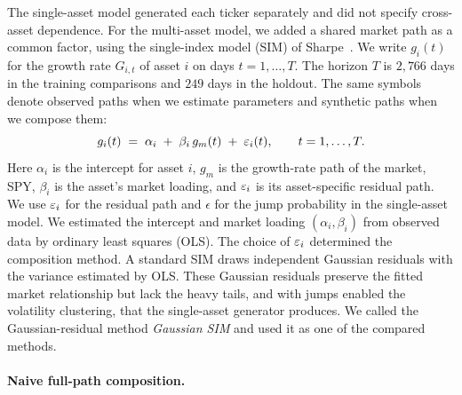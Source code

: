 
The single-asset model generated each ticker separately and did not
specify cross-asset dependence. For the multi-asset model, we added a
shared market path as a common factor, using the single-index model
(SIM) of Sharpe~\cite{sharpe1963}. We write $g_i(t)$ for the growth rate $G_{i,t}$ of asset $i$ on days
$t=1,\dots,T$. The horizon $T$ is $2{,}766$ days in the training
comparisons and $249$ days in the holdout. The same symbols denote
observed paths when we estimate parameters and synthetic paths when
we compose them:
\begin{equation}
  g_i(t) \;=\; \alpha_i \;+\; \beta_i\, g_m(t) \;+\; \varepsilon_i(t),
  \qquad t = 1,\dots,T.
  \label{eq:sim-composition}
\end{equation}
Here $\alpha_i$ is the intercept for asset $i$, $g_m$ is the
growth-rate path of the market, SPY, $\beta_i$ is the asset's market
loading, and $\varepsilon_i$ is its asset-specific residual path. We use
$\varepsilon_i$ for the residual path and $\epsilon$ for the jump probability
in the single-asset model. We estimated the intercept and market
loading $(\alpha_i,\beta_i)$ from observed data by ordinary least
squares (OLS). The choice of $\varepsilon_i$ determined the composition
method. A standard SIM draws independent Gaussian residuals with the
variance estimated by OLS. These Gaussian residuals preserve the fitted market relationship but
lack the heavy tails, and with jumps enabled the volatility
clustering, that the single-asset generator produces. We called the Gaussian-residual method
\emph{Gaussian SIM} and used it as one of the compared methods.

\paragraph{Naive full-path composition.}

